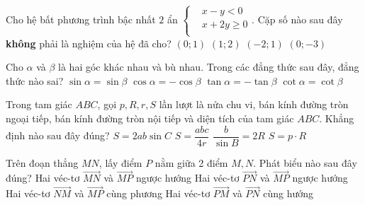 \begin{ex}%
Cho hệ bất phương trình bậc nhất $2$ ẩn $\left\{\begin{aligned}
& x-y<0\\ & x+2y\ge 0\\ \end{aligned}\right.$. Cặp số nào sau đây \textbf{không} phải là nghiệm của hệ đã cho?
\choice
{$(0;1)$}
{$(1;2)$}
{$(-2;1)$}
{\True $(0;-3)$}
\end{ex}

\begin{ex}%
Cho $\alpha$ và $\beta$ là hai góc khác nhau và bù nhau. Trong các đẳng thức sau đây, đẳng thức nào sai?
\choice
{$\sin\alpha=\sin\beta$}
{$\cos\alpha=-\cos\beta$}
{$\tan\alpha=-\tan\beta$}
{\True $\cot\alpha=\cot\beta$}
\end{ex}

\begin{ex}%
Trong tam giác $ABC$, gọi $p, R, r, S$ lần lượt là nửa chu vi, bán kính đường tròn ngoại tiếp, bán kính đường tròn nội tiếp và diện tích của tam giác $ABC$. Khẳng định nào sau đây đúng?
\choice
{$S=2ab\sin C$}
{$S=\dfrac{abc}{4r}$}
{\True $\dfrac{b}{\sin B}=2R$}
{$S=p\cdot R$}
\end{ex}

\begin{ex}%
Trên đoạn thẳng $MN$, lấy điểm $P$ nằm giữa 2 điểm $M,N$. Phát biểu nào sau đây đúng?
\choice
{Hai véc-tơ $\overrightarrow{MN}$ và $\overrightarrow{MP}$ ngược hướng}
{Hai véc-tơ $\overrightarrow{PN}$ và $\overrightarrow{MP}$ ngược hướng}
{\True Hai véc-tơ $\overrightarrow{NM}$ và $\overrightarrow{MP}$ cùng phương}
{Hai véc-tơ $\overrightarrow{PM}$ và $\overrightarrow{PN}$ cùng hướng}
\end{ex}

